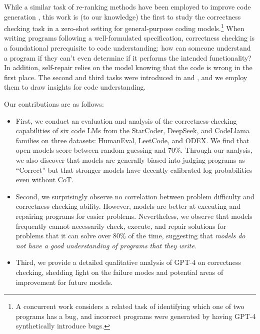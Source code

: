 While a similar task of re-ranking methods have been employed to improve code generation \citep{inala2022fault, ni2023lever}, this work is (to our knowledge) the first to study the correctness checking task in a zero-shot setting for general-purpose coding models.\footnote{A concurrent work \citep{singhal2024nofuneval} considers a related task of identifying which one of two programs has a bug, and incorrect programs were generated by having GPT-4 synthetically introduce bugs.} When writing programs following a well-formulated specification, correctness checking is a foundational prerequisite to code understanding: how can someone understand a program if they can't even determine if it performs the intended functionality? In addition, self-repair relies on the model knowing that the code is wrong in the first place. The second and third tasks were introduced in \citep{austin2021program, gu2024cruxeval} and \citep{chen2024teaching, olausson2024repair}, and we employ them to draw insights for code understanding.

Our contributions are as follows:
\begin{itemize}
    \item First, we conduct an evaluation and analysis of the correctness-checking capabilities of six code LMs from the StarCoder, DeepSeek, and CodeLlama families on three datasets: HumanEval, LeetCode, and ODEX. We find that open models score between random guessing and 70\%. Through our analysis, we also discover that models are generally biased into judging programs as ``Correct'' but that stronger models have decently calibrated log-probabilities even without CoT.
    \item Second, we surprisingly observe no correlation between problem difficulty and correctness checking ability. However, models are better at executing and repairing programs for easier problems. Nevertheless, we observe that models frequently cannot necessarily check, execute, and repair solutions for problems that it can solve over 80\% of the time, suggesting that \textit{models do not have a good understanding of programs that they write}. 
    \item Third, we provide a detailed qualitative analysis of GPT-4 on correctness checking, shedding light on the failure modes and potential areas of improvement for future models.
\end{itemize}